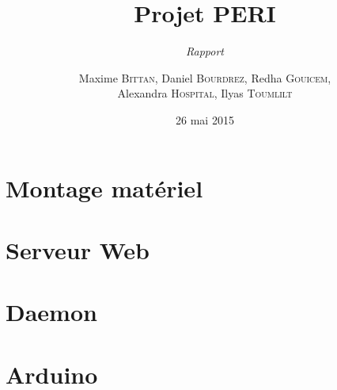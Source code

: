 \documentclass{scrreprt}
\begin{document}
\title{Projet PERI}
\subtitle{\textit{Rapport}}
\date{26 mai 2015}
\author{Maxime \textsc{Bittan}, Daniel \textsc{Bourdrez}, Redha \textsc{Gouicem},\\ Alexandra \textsc{Hospital}, Ilyas \textsc{Toumlilt}}


\maketitle

\pagebreak
\tableofcontents




\chapter{Montage matériel}
\label{ch:montage}


\chapter{Serveur Web}


\chapter{Daemon}


\chapter{Arduino}

\end{document}
